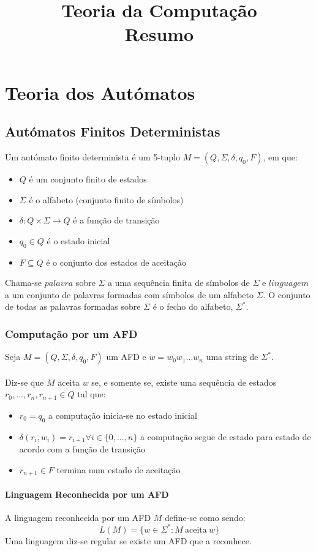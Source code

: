 \documentclass[10pt,a4paper]{report}
\title{\LARGE{Teoria da Computação} \\ \vspace{0.5cm} \normalsize{Resumo}}
\date{}
\begin{document}
\maketitle
\tableofcontents

\chapter{Teoria dos Autómatos}
\section{Autómatos Finitos Deterministas}
Um autómato finito determinista é um 5-tuplo $M = (Q,\Sigma,\delta,q_0,F)$, em que:
\begin{itemize}
\item $Q$ é um conjunto finito de estados
\item $\Sigma$ é o alfabeto (conjunto finito de símbolos)
\item $\delta: Q \times \Sigma \rightarrow Q$ é a função de transição
\item $q_0 \in Q$ é o estado inicial
\item $F \subseteq Q$ é o conjunto dos estados de aceitação
\end{itemize}
Chama-se $palavra$ sobre $\Sigma$ a uma sequência finita de símbolos de $\Sigma$ e $linguagem$ a um conjunto de palavras formadas com símbolos de um alfabeto $\Sigma$. O conjunto de todas as palavras formadas sobre $\Sigma$ é o fecho do alfabeto, $\Sigma^*$.
\subsection{Computação por um AFD}
Seja $M = (Q,\Sigma,\delta,q_0,F)$ um AFD e $w = w_0w_1...w_n$ uma string de $\Sigma^*$.\\
\\
Diz-se que $M$ aceita $w$ se, e somente se, existe uma sequência de estados $r_0, ..., r_n, r_{n+1} \in Q$ tal que:
\begin{itemize}
\item $r_0 = q_0$ a computação inicia-se no estado inicial
\item $\delta(r_i,w_i) = r_{i+1} \forall i \in \{0,...,n\}$ a computação segue de estado para estado de acordo com a função de transição
\item $r_{n+1} \in F$ termina num estado de aceitação
\end{itemize}
\subsubsection{Linguagem Reconhecida por um AFD}
A linguagem reconhecida por um AFD $M$ define-se como sendo:
$$
L(M) = \{w \in \Sigma^*:M \: \text{aceita} \: w\}
$$
Uma linguagem diz-se regular se existe um AFD que a reconhece.
\end{document}
